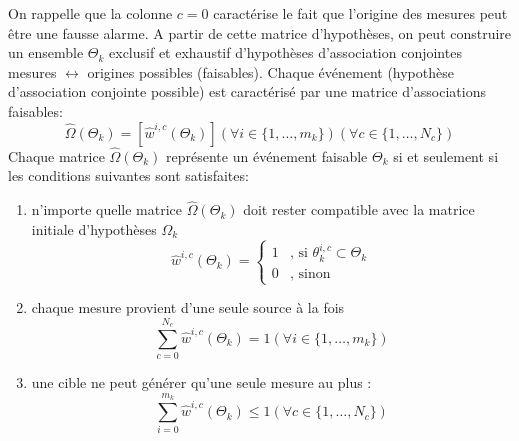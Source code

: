 \documentclass[10pt,french,a4paper]{report}
\begin{document}
	 On rappelle que la colonne $c = 0$ caractérise le fait que l'origine des mesures peut être une fausse alarme. A partir de cette matrice d'hypothèses, on peut construire un ensemble  $\Theta_k$ exclusif et exhaustif
d'hypothèses d'association conjointes mesures  $\longleftrightarrow$ origines possibles (faisables). Chaque événement
(hypothèse d'association conjointe possible) est caractérisé par une matrice d'associations faisables:
\begin{equation}
 \hat{\Omega}(\Theta_k) =   [\hat{w}^{i,c}(\Theta_k)] (\forall i \in \{1,\ldots,m_k\})(\forall c \in \{1,\ldots,N_c\})
\end{equation}	
Chaque matrice $ \hat{\Omega}(\Theta_k) $ représente un événement faisable $\Theta_k$ si et seulement si les conditions suivantes
sont satisfaites:
\begin{enumerate}[label=\arabic*.]
\item  n'importe quelle matrice $\hat{\Omega}(\Theta_k)$ doit rester compatible avec la matrice initiale d'hypothèses $ \Omega_k$
  \begin{equation}
 \hat{w}^{i,c}(\Theta_k)= \begin{cases}
1& \mbox{, si } \theta_k^{i,c} \subset \Theta_k  \\
0& \mbox{, sinon }
\end{cases}
	 \end{equation}	
\item chaque mesure provient d'une seule source à la fois	 
	   \begin{equation}
\sum_{c=0}^{N_c} \hat{w}^{i,c}(\Theta_k) =1 (\forall i \in\{1,\ldots,m_k\})
	 \end{equation}	
	 \item une cible ne peut générer qu'une seule mesure au plus :
		   \begin{equation}
\sum_{i=0}^{m_k} \hat{w}^{i,c}(\Theta_k) \leq 1 (\forall c \in\{1,\ldots,N_c\})
	 \end{equation}	 
\end{enumerate}
\end{document}
